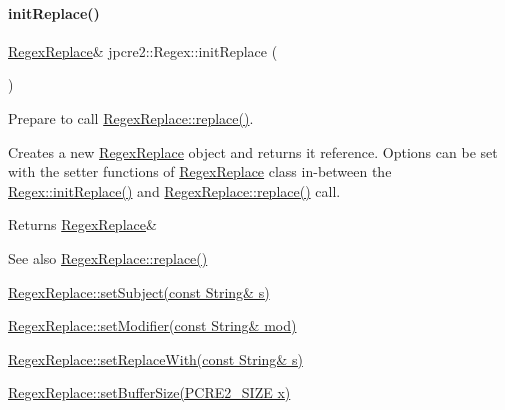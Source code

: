 \paragraph{\texorpdfstring{init\+Replace()}{initReplace()}}
{\footnotesize\ttfamily \hyperlink{classjpcre2_1_1RegexReplace}{Regex\+Replace}\& jpcre2\+::\+Regex\+::init\+Replace (\begin{DoxyParamCaption}{ }\end{DoxyParamCaption})\hspace{0.3cm}{\ttfamily [inline]}}



Prepare to call \hyperlink{classjpcre2_1_1RegexReplace_afd087fa7a9bfedec802d1a3dd7edbdd0_afd087fa7a9bfedec802d1a3dd7edbdd0}{Regex\+Replace\+::replace()}. 

Creates a new \hyperlink{classjpcre2_1_1RegexReplace}{Regex\+Replace} object and returns it reference. Options can be set with the setter functions of \hyperlink{classjpcre2_1_1RegexReplace}{Regex\+Replace} class in-\/between the \hyperlink{classjpcre2_1_1Regex_ae7235a991492fa88f1bd3fb02d59cd0a_ae7235a991492fa88f1bd3fb02d59cd0a}{Regex\+::init\+Replace()} and \hyperlink{classjpcre2_1_1RegexReplace_afd087fa7a9bfedec802d1a3dd7edbdd0_afd087fa7a9bfedec802d1a3dd7edbdd0}{Regex\+Replace\+::replace()} call. \begin{DoxyReturn}{Returns}
\hyperlink{classjpcre2_1_1RegexReplace}{Regex\+Replace}\& 
\end{DoxyReturn}
\begin{DoxySeeAlso}{See also}
\hyperlink{classjpcre2_1_1RegexReplace_afd087fa7a9bfedec802d1a3dd7edbdd0_afd087fa7a9bfedec802d1a3dd7edbdd0}{Regex\+Replace\+::replace()} 

\hyperlink{classjpcre2_1_1RegexReplace_a46eefdb105827920bebc8436721fa4cb_a46eefdb105827920bebc8436721fa4cb}{Regex\+Replace\+::set\+Subject(const String\& s)} 

\hyperlink{classjpcre2_1_1RegexReplace_ae2abe2994b0fbe54950f88e63000c910_ae2abe2994b0fbe54950f88e63000c910}{Regex\+Replace\+::set\+Modifier(const String\& mod)} 

\hyperlink{classjpcre2_1_1RegexReplace_af1069f489de9b343493da2dc77b04c73_af1069f489de9b343493da2dc77b04c73}{Regex\+Replace\+::set\+Replace\+With(const String\& s)} 

\hyperlink{classjpcre2_1_1RegexReplace_a452dd2632031a13b39c13b792f18a491_a452dd2632031a13b39c13b792f18a491}{Regex\+Replace\+::set\+Buffer\+Size(\+P\+C\+R\+E2\+\_\+\+S\+I\+Z\+E x)} 
\end{DoxySeeAlso}
\hypertarget{classjpcre2_1_1Regex_ab93775a93a0a537d09b9e9ab4a5a3894_ab93775a93a0a537d09b9e9ab4a5a3894}{}\label{classjpcre2_1_1Regex_ab93775a93a0a537d09b9e9ab4a5a3894_ab93775a93a0a537d09b9e9ab4a5a3894} 
